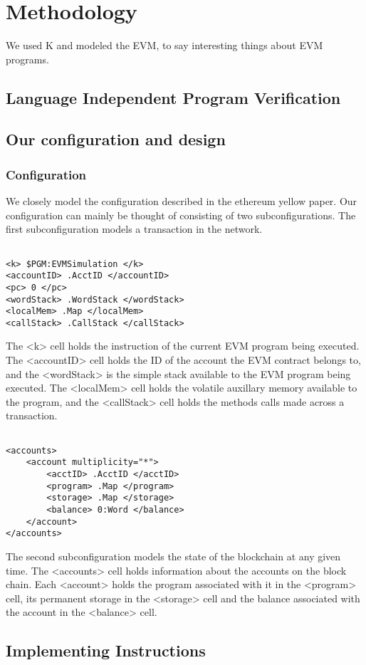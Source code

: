 \section{Methodology}
We used K and modeled the EVM, to say interesting things about EVM programs.
\subsection{Language Independent Program Verification}
\subsection{Our configuration and design}
\subsubsection{Configuration}
We closely model the configuration described in the ethereum yellow paper. Our configuration can mainly be thought of consisting of two subconfigurations. The first subconfiguration models a transaction in the network.
\begin{verbatim}

<k> $PGM:EVMSimulation </k>
<accountID> .AcctID </accountID>
<pc> 0 </pc>
<wordStack> .WordStack </wordStack>
<localMem> .Map </localMem>
<callStack> .CallStack </callStack>

\end{verbatim}

The <k> cell holds the instruction of the current EVM program being executed. The <accountID> cell holds the ID of the account the EVM contract belongs to, and the <wordStack> is the simple stack available to the EVM program being executed. The <localMem> cell holds the volatile auxillary memory available to the program, and the <callStack> cell holds the methods calls made across a transaction.

\begin{verbatim}

<accounts>
    <account multiplicity="*">
        <acctID> .AcctID </acctID>
        <program> .Map </program>
        <storage> .Map </storage>
        <balance> 0:Word </balance>
    </account>
</accounts>

\end{verbatim}

The second subconfiguration models the state of the blockchain at any given time. The <accounts> cell holds information about the accounts on the block chain. Each <account> holds the program associated with it in the <program> cell, its permanent storage in the <storage> cell and the balance associated with the account in the <balance> cell.

\subsection{Implementing Instructions}

